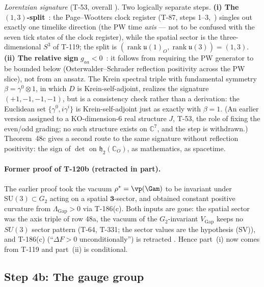 \emph{Lorentzian signature} (T-53, overall ). Two logically separate steps.
\textbf{(i) The $(1,3)$-split}~: the Page--Wootters clock register (T-87, steps
1--3,~) singles out exactly one timelike direction (the PW time \emph{axis} ---
not to be confused with the seven tick states of the clock register), while the spatial
sector is the three-dimensional $S^3$ of T-119; the split is
$(\operatorname{rank}\mathfrak{u}(1)_O, \operatorname{rank}\mathfrak{u}(3)) = (1,3)$.
\textbf{(ii) The relative sign} $g_{aa} < 0$~: it
follows from requiring the PW generator to be bounded below (Osterwalder--Schrader
reflection positivity across the PW slice), not from an ansatz. The Krein spectral triple
with fundamental symmetry $\beta = \gamma^0 \otimes 1$, in which $D$ is Krein-self-adjoint,
realizes the signature $(+1,-1,-1,-1)$, but is a consistency check rather than a
derivation: the Euclidean set $\{\gamma^0, i\gamma^i\}$ is Krein-self-adjoint just as
exactly with $\beta = 1$. (An earlier version assigned to a KO-dimension-6 real structure
$J$, T-53, the role of fixing the even/odd grading; no such structure exists on
$\mathbb{C}^7$, and the step is withdrawn.) Theorem~48c gives a second route to the same
signature without reflection positivity: the sign of $\det$ on $\mathfrak h_2(\mathbb{C}_O)$,
 as mathematics,  as spacetime.

\paragraph{Former proof of T-120b (retracted in part).}
The earlier proof took the vacuum $\rho^* = \vp(\Gam)$ to be invariant under
$\mathrm{SU}(3) \subset G_2$ acting on a spatial $\mathbf{3}$-sector, and obtained constant
positive curvature from $\Lambda_{\mathrm{Gap}} > 0$ via T-186(c). Both inputs are gone: the
spatial sector was the axis triple of row 48a, the vacuum of the $G_2$-invariant
$V_{\mathrm{Gap}}$ keeps no $SU(3)$ sector pattern (T-64, T-331; the sector values are the
hypothesis (SV)), and T-186(c) (``$\Delta F > 0$ unconditionally'') is retracted
\status{$\times$}. Hence part~(i) now comes from T-119 and part~(ii) is conditional.

\subsection{Step 4b: The gauge group}

